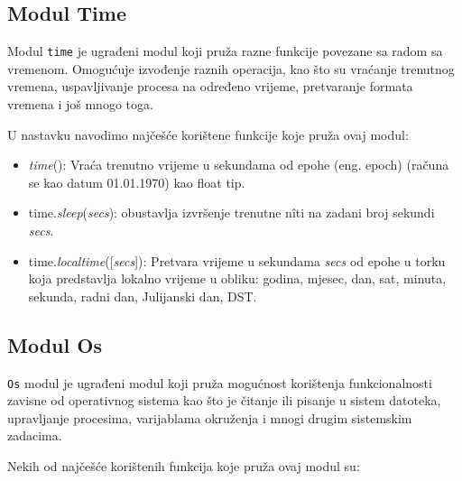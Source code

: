 \subsection{Modul Time}

Modul  \texttt{time} je ugrađeni modul koji pruža razne funkcije povezane sa radom sa vremenom. Omogućuje   izvođenje raznih operacija, kao što su vraćanje trenutnog vremena, uspavljivanje procesa na određeno vrijeme,  pretvaranje formata vremena i još mnogo toga.

U nastavku navodimo najčešće korištene funkcije koje pruža ovaj modul:
\begin{itemize}
	\item  \textit{time}(): Vraća trenutno vrijeme u sekundama od epohe (eng. epoch) (računa se kao datum 01.01.1970) kao float tip. 
	\item time.\textit{sleep}(\textit{secs}): obustavlja izvršenje trenutne n\^iti na zadani broj sekundi \textit{secs}. 
	\item time.\textit{localtime}([\textit{secs}]): Pretvara vrijeme u sekundama \textit{secs} od epohe u torku koja predstavlja lokalno vrijeme u obliku:  godina, mjesec, dan, sat, minuta, sekunda, radni dan, Julijanski dan, DST.
\end{itemize}


\subsection{Modul Os}

\texttt{Os} modul je ugrađeni  modul koji pruža mogućnost korištenja funkcionalnosti zavisne od operativnog sistema kao što je čitanje ili pisanje u sistem datoteka, upravljanje procesima, varijablama okruženja i mnogi drugim sistemskim zadacima.

Nekih od najčešće korištenih funkcija koje pruža ovaj modul su:

